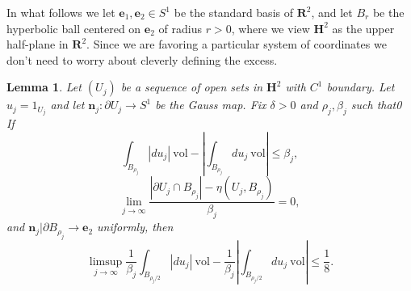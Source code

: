 \documentclass[reqno,12pt,letterpaper]{amsart}
\newcommand{\RR}{\mathbf{R}}
\newcommand{\Hyp}{\mathbf H}
\newcommand{\evect}{\mathbf e}
\newcommand{\normal}{\mathbf n}
\newcommand{\vol}{\mathrm{vol}}
\newtheorem{lemma}[theorem]{Lemma}
\theoremstyle{definition}
\numberwithin{equation}{section}
\begin{document}
In what follows we let $\evect_1, \evect_2 \in S^1$ be the standard basis of $\RR^2$, and let $B_r$ be the hyperbolic ball centered on $\evect_2$ of radius $r > 0$, where we view $\Hyp^2$ as the upper half-plane in $\RR^2$.
Since we are favoring a particular system of coordinates we don't need to worry about cleverly defining the excess.

\begin{lemma}
Let $(U_j)$ be a sequence of open sets in $\Hyp^2$ with $C^1$ boundary.
Let $u_j = 1_{U_j}$ and let $\normal_j: \partial U_j \to S^1$ be the Gauss map.
Fix $\delta > 0$ and $\rho_j, \beta_j$ such that0
If
$$\int_{B_{\rho_j}} |du_j| ~\vol - \left|\int_{B_{\rho_j}} du_j ~\vol\right| \leq \beta_j,$$
$$\lim_{j \to \infty} \frac{|\partial U_j \cap B_{\rho_j}| - \eta(U_j, B_{\rho_j})}{\beta_j} = 0,$$
and $\normal_j|\partial B_{\rho_j} \to \evect_2$ uniformly,
then
$$\limsup_{j \to \infty} \frac{1}{\beta_j} \int_{B_{\rho_j/2}} |du_j| ~\vol - \frac{1}{\beta_j}\left|\int_{B_{\rho_j/2}} du_j ~\vol\right| \leq \frac{1}{8}.$$
\end{lemma}
\end{document}
